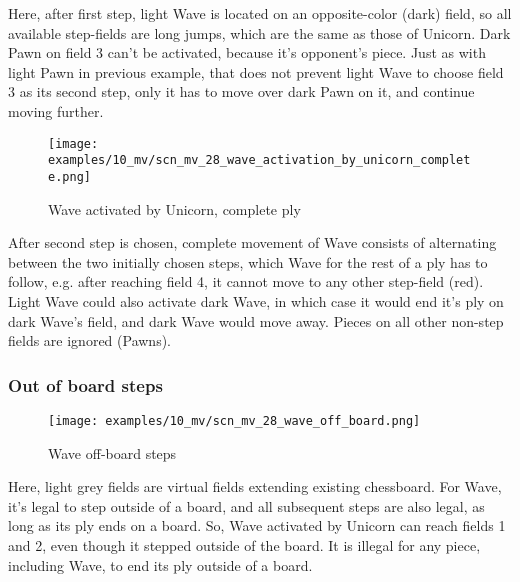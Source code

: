 Here, after first step, light Wave is located on an opposite-color (dark) field, so all available
step-fields are long jumps, which are the same as those of Unicorn. Dark Pawn on field 3 can't be
activated, because it's opponent's piece. Just as with light Pawn in previous example, that does
not prevent light Wave to choose field 3 as its second step, only it has to move over dark Pawn
on it, and continue moving further.

\clearpage %

\vspace*{-2.1\baselineskip}
\noindent
\begin{figure}[!h]
\texttt{[image: examples/10\_mv/scn\_mv\_28\_wave\_activation\_by\_unicorn\_complete.png]}
\caption{Wave activated by Unicorn, complete ply}
\label{fig:scn_mv_28_wave_activation_by_unicorn_complete}
\end{figure}

After second step is chosen, complete movement of Wave consists of alternating between the two initially
chosen steps, which Wave for the rest of a ply has to follow, e.g. after reaching field 4, it cannot move
to any other step-field (red). Light Wave could also activate dark Wave, in which case it would end it's
ply on dark Wave's field, and dark Wave would move away. Pieces on all other non-step fields are ignored
(Pawns).

\clearpage %

\subsubsection*{Out of board steps}

\vspace*{-1.4\baselineskip}
\noindent
\begin{figure}[!h]
\texttt{[image: examples/10\_mv/scn\_mv\_28\_wave\_off\_board.png]}
\caption{Wave off-board steps}
\label{fig:scn_mv_28_wave_off_board}
\end{figure}

Here, light grey fields are virtual fields extending existing chessboard.
For Wave, it's legal to step outside of a board, and all subsequent steps
are also legal, as long as its ply ends on a board. So, Wave activated by
Unicorn can reach fields 1 and 2, even though it stepped outside of the
board. It is illegal for any piece, including Wave, to end its ply outside
of a board.

